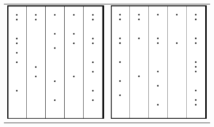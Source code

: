 \documentclass[a4paper, 11pt]{article}
\begin{document}
\begin{figure}
\begin{center}
\begin{tabular}{c c}
\includegraphics[scale=0.25]{Images/5By5One.png} &
\includegraphics[scale=0.25]{Images/5By5Two.png}

\end{tabular}
\end{center}
\end{figure}
\end{document}
